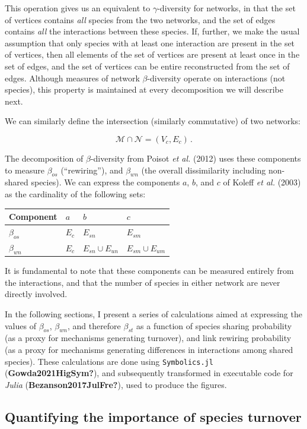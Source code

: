 \documentclass[11pt]{article}
\begin{document}
This operation gives us an equivalent to \(\gamma\)-diversity for
networks, in that the set of vertices contains \emph{all} species from
the two networks, and the set of edges contains \emph{all} the
interactions between these species. If, further, we make the usual
assumption that only species with at least one interaction are present
in the set of vertices, then all elements of the set of vertices are
present at least once in the set of edges, and the set of vertices can
be entire reconstructed from the set of edges. Although measures of
network \(\beta\)-diversity operate on interactions (not species), this
property is maintained at every decomposition we will describe next.

We can similarly define the intersection (similarly commutative) of two
networks:

\[\mathcal{M} \cap \mathcal{N} = (V_c, E_c)\,.\]

The decomposition of \(\beta\)-diversity from Poisot \emph{et al.}
(2012) uses these components to measure \(\beta_{os}\) (``rewiring''),
and \(\beta_{wn}\) (the overall dissimilarity including non-shared
species). We can express the components \(a\), \(b\), and \(c\) of
Koleff \emph{et al.} (2003) as the cardinality of the following sets:

\begin{longtable}[]{@{}llll@{}}
\toprule
Component & \(a\) & \(b\) & \(c\)\tabularnewline
\midrule
\endhead
\(\beta_{os}\) & \(E_c\) & \(E_{sn}\) & \(E_{sm}\)\tabularnewline
\(\beta_{wn}\) & \(E_c\) & \(E_{sn} \cup E_{un}\) &
\(E_{sm} \cup E_{um}\)\tabularnewline
\bottomrule
\end{longtable}

It is fundamental to note that these components can be measured entirely
from the interactions, and that the number of species in either network
are never directly involved.

In the following sections, I present a series of calculations aimed at
expressing the values of \(\beta_{os}\), \(\beta_{wn}\), and therefore
\(\beta_{st}\) as a function of species sharing probability (as a proxy
for mechanisms generating turnover), and link rewiring probability (as a
proxy for mechanisms generating differences in interactions among shared
species). These calculations are done using \texttt{Symbolics.jl}
(\textbf{Gowda2021HigSym?}), and subsequently transformed in executable
code for \emph{Julia} (\textbf{Bezanson2017JulFre?}), used to produce
the figures.

\hypertarget{quantifying-the-importance-of-species-turnover}{%
\subsection{Quantifying the importance of species
turnover}\label{quantifying-the-importance-of-species-turnover}}
\end{document}
